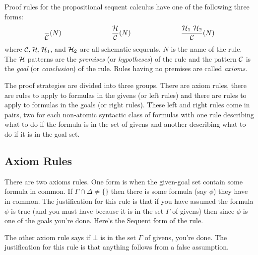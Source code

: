 \documentclass[11pt]{article}
\newcommand{\rbreak}{\ \\}
\newcommand{\NamedSequentRule}[3]{{\mbox{{\begin{tabular}{c} {\mbox{$#1$}}\vspace{.25em}\\ \hline \vspace{.25em} {\mbox{$#2$}} \end{tabular}}{\hspace{.5em}{#3}}}}}
\begin{document}
Proof rules for the propositional sequent calculus have one of the
following three forms:
\[\frac{}{{\cal{C}}}(N) \hspace{1in} \frac{{\cal{H}}}{\cal{C}}(N) \hspace{1in} \frac{{\cal{H}}_1\,\,{\cal{H}}_2}{{\cal{C}}}(N) \]
where ${\cal{C}}, {\cal{H}}, {\cal{H}}_1$, and ${\cal{H}}_2$ are all
schematic sequents.  $N$ is the name of the rule.  The ${\cal{H}}$
patterns are the {\em{premises}} (or {\em{hypotheses}}) of the rule
and the pattern ${\cal{C}}$ is the {\em{goal}} (or {\em{conclusion}})
of the rule.  Rules having no premises are called {\em{axioms}}.

The proof strategies are divided into three groups.  There are axiom rules,
there are rules to apply to formulas in the givens (or left rules) and there
are rules to apply to formulas in the goals (or right rules).  These left and
right rules come in pairs, two for each non-atomic syntactic class of formulas
with one rule describing what to do if the formula is in the set of givens and
another describing what to do if it is in the goal set.






\subsection{Axiom Rules}

There are two axioms rules.  One form is when the given-goal set contain some
formula in common.  If $\Gamma\cap\Delta\not=\{\}$ then there is some formula
(say $\phi$) they have in common.  The justification for this rule is that if
you have assumed the formula $\phi$ is true (and you must have because it is in
the set $\Gamma$ of givens) then since $\phi$ is one of the goals you're done.
Here's the Sequent form of the rule.

The other axiom rule says if $\bot$ is in the set $\Gamma$ of givens, you're
done.  The justification for this rule is that anything follows from a false
assumption.
\end{document}
